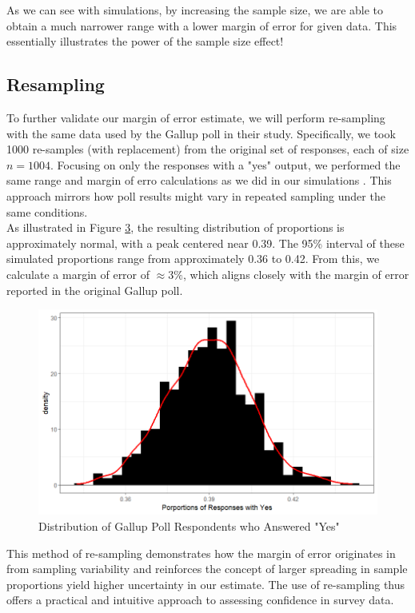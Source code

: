\documentclass{article}\usepackage[]{graphicx}\usepackage[]{xcolor}
\begin{document}
\begin{multicols}{2}
As we can see with simulations, by increasing the sample size, we are able to obtain a much narrower range with a lower margin of error for given data. This essentially illustrates the power of the sample size effect!

\subsection{Resampling}
To further validate our margin of error estimate, we will perform re-sampling with the same data used by the Gallup poll in their study. Specifically, we took 1000 re-samples (with replacement) from the original set of responses, each of size $n = 1004$. Focusing on only the responses with a "yes" output, we performed the same range and margin of erro calculations as we did in our simulations . This approach mirrors how poll results might vary in repeated sampling under the same conditions. \\

As illustrated in Figure \hyperref[fig3]{3}, the resulting distribution of proportions is approximately normal, with a peak centered near 0.39. The 95\% interval of these simulated proportions range from approximately 0.36 to 0.42. From this, we calculate a margin of error of $\approx 3\%$, which aligns closely with the margin of error reported in the original Gallup poll.

\begin{figure}[H]
  \centering
  \includegraphics[width=\columnwidth]{GallupYes.png}
  \caption{Distribution of Gallup Poll Respondents who Answered "Yes"}
  \label{fig3}
\end{figure}

This method of re-sampling demonstrates how the margin of error originates in from sampling variability and reinforces the concept of larger spreading in sample proportions yield higher uncertainty in our estimate. The use of re-sampling thus offers a practical and intuitive approach to assessing confidence in survey data.


\end{multicols}
\end{document}
